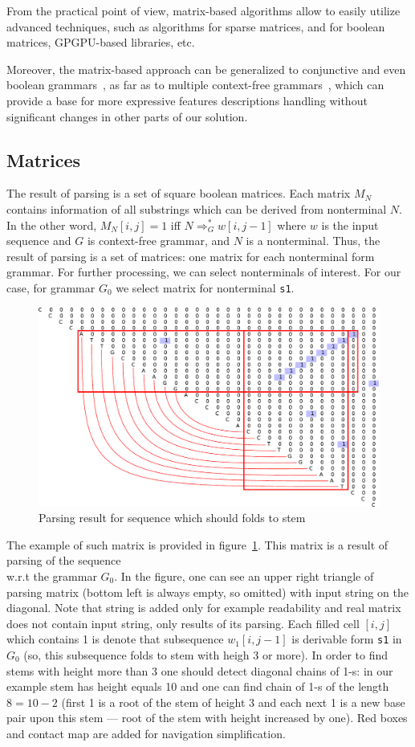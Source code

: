 \documentclass[a4paper,twoside]{article}
\begin{document}
From the practical point of view, matrix-based algorithms allow to easily utilize advanced techniques, such as algorithms for sparse matrices, and for boolean matrices, GPGPU-based libraries, etc.

Moreover, the matrix-based approach can be generalized to conjunctive and even boolean grammars~\cite{OKHOTIN2014101}, as far as to multiple context-free grammars~\cite{mcfgMatrices}, which can provide a base for more expressive features descriptions handling without significant changes in other parts of our solution.

\subsection{Matrices}

\noindent The result of parsing is a set of square boolean matrices. 
Each matrix $M_N$ contains information of all substrings which can be derived from nonterminal $N$.
In the other word, $M_N[i,j]=1$ iff $N \Rightarrow^*_G w[i,j-1]$ where $w$ is the input sequence and $G$ is context-free grammar, and $N$ is a nonterminal.
Thus, the result of parsing is a set of matrices: one matrix for each nonterminal form grammar.
For further processing, we can select nonterminals of interest.
For our case, for grammar $G_0$ we select matrix for nonterminal \verb|s1|.

\begin{figure}
\centering
\includegraphics[width=.45\textwidth]{figures/4.pdf}
\caption{Parsing result for sequence which should folds to stem}
\label{fig:matrix-simple-stem}
\end{figure}

The example of such matrix is provided in figure~\ref{fig:matrix-simple-stem}.
This matrix is a result of parsing of the sequence {  \\} w.r.t the grammar $G_0$.
In the figure, one can see an upper right triangle of parsing matrix (bottom left is always empty, so omitted) with input string on the diagonal.
Note that string is added only for example readability and real matrix does not contain input string, only results of its parsing.
Each filled cell $[i,j]$ which contains 1 is denote that subsequence $w_1[i,j-1]$ is derivable form \verb|s1| in $G_0$ (so, this subsequence folds to stem with heigh 3 or more).
In order to find stems with height more than 3 one should detect diagonal chains of 1-s: in our example stem has height equals 10 and one can find chain of 1-s of the length $8=10-2$ (first 1 is a root of the stem of height 3 and each next 1 is a new base pair upon this stem --- root of the stem with height increased by one).
Red boxes and contact map are added for navigation simplification.
\end{document}

